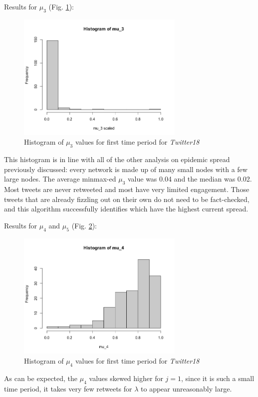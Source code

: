 \documentclass[preprint,review,12pt]{elsarticle}
\begin{document}
Results for $\mu_3$ (Fig. \ref{fig:Hist mu_3 Twitter18}):
\begin{figure}[h!]
    \centering
    \includegraphics[width=8cm]{histogram_mu_3_scaled.png}
    \caption{Histogram of $\mu_3$ values for first time period for \textit{Twitter18}}
    \label{fig:Hist mu_3 Twitter18}
\end{figure}

This histogram is in line with all of the other analysis on epidemic spread previously discussed: every network is made up of many small nodes with a few large nodes. The average minmax-ed $\mu_3$ value was 0.04 and the median was 0.02. Most tweets are never retweeted and most have very limited engagement. Those tweets that are already fizzling out on their own do not need to be fact-checked, and this algorithm successfully identifies which have the highest current spread. 

Results for $\mu_4$ and $\mu_5$ (Fig. \ref{fig:Hist mu_4 Twitter18}):
\begin{figure}[h!]
    \centering
    \includegraphics[width=8cm]{histogram of mu_4.png}
    \caption{Histogram of $\mu_4$ values for first time period for \textit{Twitter18}}
    \label{fig:Hist mu_4 Twitter18}
\end{figure}
As can be expected, the $\mu_4$ values skewed higher for $j=1$, since it is such a small time period, it takes very few retweets for $\lambda$ to appear unreasonably large.  
\end{document}
